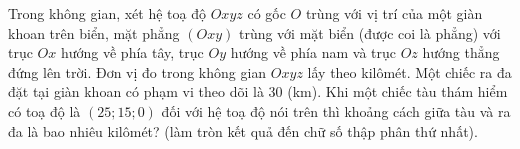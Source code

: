 \begin{bt}%
	Trong không gian, xét hệ toạ độ $Oxyz$ có gốc $O$ trùng với vị trí của một giàn  khoan trên biển, mặt phẳng $(Oxy)$ trùng với mặt biển (được coi là phẳng) với trục $Ox$ hướng về phía tây, trục $Oy$ hướng về phía nam và trục $Oz$ hướng thẳng đứng lên trời. Đơn vị đo trong không gian $Oxyz$ lấy theo kilômét. Một chiếc ra đa đặt tại giàn khoan có phạm vi theo dõi là $30$ (km). Khi một chiếc tàu thám hiểm có toạ độ là $(25;15;0)$ đối với hệ toạ độ nói trên thì khoảng cách giữa tàu và ra đa là bao nhiêu kilômét? (làm tròn kết quả đến chữ số thập phân thứ nhất).
\end{bt}

